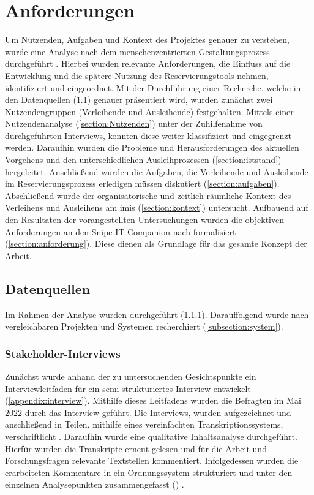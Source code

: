 \chapter{Anforderungen}
\label{chapter-analyse}

Um Nutzenden, Aufgaben und Kontext des Projektes genauer zu verstehen, wurde eine Analyse nach dem
menschenzentrierten Gestaltungsprozess durchgeführt \cite{DINISO9241}. Hierbei wurden relevante
Anforderungen, die Einfluss auf die Entwicklung und die spätere Nutzung des Reservierungstools
nehmen, identifiziert und eingeordnet. Mit der Durchführung einer Recherche, welche in den
Datenquellen (\ref{section:daten}) genauer präsentiert wird, wurden zunächst zwei Nutzendengruppen
(Verleihende und Ausleihende) festgehalten. Mittels einer Nutzendenanalyse (\ref{section:Nutzenden})
unter der Zuhilfenahme von durchgeführten Interviews, konnten diese weiter klassifiziert und
eingegrenzt werden. Daraufhin wurden die Probleme und Herausforderungen des aktuellen Vorgehens und
den unterschiedlichen Ausleihprozessen (\ref{section:iststand}) hergeleitet. Anschließend wurden die
Aufgaben, die Verleihende und Ausleihende im Reservierungsprozess erledigen müssen diskutiert
(\ref{section:aufgaben}). Abschließend wurde der organisatorische und zeitlich-räumliche Kontext des
Verleihens und Ausleihens am \ac{imis} (\ref{section:kontext}) untersucht. Aufbauend auf den
Resultaten der vorangestellten Untersuchungen wurden die objektiven Anforderungen an den Snipe-IT
Companion nach  formalisiert (\ref{section:anforderung}). Diese dienen als
Grundlage für das gesamte Konzept der Arbeit.

\section{Datenquellen}
\label{section:daten}
Im Rahmen der Analyse wurden  durchgeführt
(\ref{subsection:interview}). Darauffolgend wurde nach vergleichbaren Projekten und Systemen
recherchiert (\ref{subsection:system}).

\subsection{Stakeholder-Interviews}
\label{subsection:interview}
Zunächst wurde anhand der zu untersuchenden Gesichtspunkte ein Interviewleitfaden für ein
semi-strukturiertes Interview entwickelt (\ref{appendix:interview}). Mithilfe dieses Leitfadens
wurden die Befragten im Mai 2022 durch das Interview geführt. Die Interviews, wurden aufgezeichnet
und anschließend in Teilen, mithilfe eines vereinfachten Transkriptionssystems, verschriftlicht
\cite{dresing_praxisbuch_2016}. Daraufhin wurde eine qualitative Inhaltsanalyse durchgeführt.
Hierfür wurden die Transkripte erneut gelesen und für die Arbeit und Forschungsfragen relevante
Textstellen kommentiert. Infolgedessen wurden die erarbeiteten Kommentare in ein Ordnungssystem
strukturiert und unter den einzelnen Analysepunkten zusammengefasst ()
\cite{dresing_praxisbuch_2016}.

